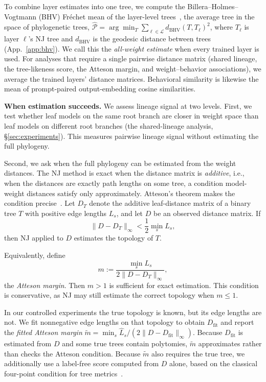 \documentclass{article}
\theoremstyle{definition}
\theoremstyle{plain}
\newif\ifrevision
\newcommand{\rev}[1]{\ifrevision{\color{blue}#1}\else#1\fi}
\newcommand{\revtag}[1]{\ifrevision\textsuperscript{\color{blue}\sffamily\scriptsize[#1]}\fi}
\begin{document}
To combine layer estimates into one tree, we compute the Billera--Holmes--Vogtmann (BHV)
Fr\'echet mean of the layer-level trees~\citep{billera2001geometry, willis2019confidence}, the average tree in the space of phylogenetic trees\rev{, $\widehat{\mathcal{P}}=\arg\min_{T}\sum_{\ell\in\mathcal{L}}d_{\mathrm{BHV}}(T,T_\ell)^2$, where $T_\ell$ is layer $\ell$'s NJ tree and $d_{\mathrm{BHV}}$ is the geodesic distance between trees (App.~\ref{app:bhv}).}\revtag{FgwB} We call this the \emph{all-weight estimate} when every trained layer is used. For analyses that require a single pairwise distance matrix (shared lineage, the tree-likeness score, the Atteson margin,
and weight--behavior associations), we average the trained layers' distance
matrices. Behavioral similarity is likewise the mean of prompt-paired output-embedding
cosine similarities.



\textbf{When estimation succeeds.}\label{sec:framework:theory}
We assess lineage signal at two levels. First, we test whether leaf models on the same root branch are closer in weight space than leaf models on different root branches (the shared-lineage analysis, \S\ref{sec:experiments}). This measures pairwise lineage signal without estimating the full phylogeny.

Second, we ask when the full phylogeny can be estimated from the weight distances. The NJ method is exact when the distance matrix is
\emph{additive}, i.e., when the distances are exactly path lengths on some tree, a condition model-weight distances satisfy only approximately. Atteson's theorem makes the
condition precise~\citep{atteson1999performance}. Let $D_T$ denote the additive leaf-distance matrix of a binary tree $T$ with positive edge lengths ${L_s}$, and let $D$ be an observed distance matrix. If
$$
\lVert D-D_T\rVert_\infty < \frac{1}{2}\min_s L_s,
$$
then NJ applied to $D$ estimates the topology of $T$.

Equivalently, define
$$
m:=\frac{\min_s L_s}{2\lVert D-D_T\rVert_\infty},
$$
the \emph{Atteson margin}. Then $m>1$ is sufficient for exact estimation. This condition is conservative, as NJ may still estimate the correct topology when $m\leq1$.

In our controlled experiments the true topology is
known, but its edge lengths are not. We fit nonnegative edge lengths on that topology to obtain
$D_{\mathrm{fit}}$ and report the \emph{fitted Atteson margin}
$\widetilde m=\min_s\widehat L_s/(2\lVert D-D_{\mathrm{fit}}\rVert_\infty)$. Because
$D_{\mathrm{fit}}$ is estimated from $D$ and some true trees contain polytomies, $\widetilde m$ approximates rather than checks the Atteson condition. Because $\widetilde m$ also requires the true tree, we additionally
use a label-free score computed from $D$ alone, based on the classical four-point condition for tree
metrics~\citep{sempleSteel2003phylogenetics}.
\end{document}
